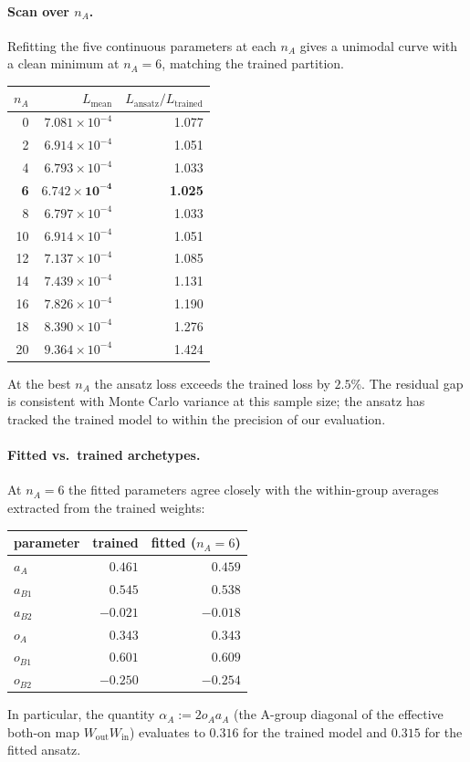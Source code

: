 \documentclass[11pt]{article}
\begin{document}
\paragraph{Scan over $n_A$.}
Refitting the five continuous parameters at each $n_A$ gives a unimodal curve with a clean minimum at $n_A = 6$, matching the trained partition.
\begin{center}
\begin{tabular}{rrr}
\toprule
$n_A$ & $L_{\mathrm{mean}}$ & $L_{\mathrm{ansatz}} / L_{\mathrm{trained}}$ \\
\midrule
0  & $7.081 \times 10^{-4}$ & 1.077 \\
2  & $6.914 \times 10^{-4}$ & 1.051 \\
4  & $6.793 \times 10^{-4}$ & 1.033 \\
\textbf{6}  & $\mathbf{6.742 \times 10^{-4}}$ & \textbf{1.025} \\
8  & $6.797 \times 10^{-4}$ & 1.033 \\
10 & $6.914 \times 10^{-4}$ & 1.051 \\
12 & $7.137 \times 10^{-4}$ & 1.085 \\
14 & $7.439 \times 10^{-4}$ & 1.131 \\
16 & $7.826 \times 10^{-4}$ & 1.190 \\
18 & $8.390 \times 10^{-4}$ & 1.276 \\
20 & $9.364 \times 10^{-4}$ & 1.424 \\
\bottomrule
\end{tabular}
\end{center}
At the best $n_A$ the ansatz loss exceeds the trained loss by $2.5\%$.
The residual gap is consistent with Monte Carlo variance at this sample size; the ansatz has tracked the trained model to within the precision of our evaluation.

\paragraph{Fitted vs.\ trained archetypes.}
At $n_A = 6$ the fitted parameters agree closely with the within-group averages extracted from the trained weights:
\begin{center}
\begin{tabular}{lrr}
\toprule
parameter & trained & fitted ($n_A = 6$) \\
\midrule
$a_A$   &  $0.461$ & $0.459$ \\
$a_{B1}$ & $0.545$ & $0.538$ \\
$a_{B2}$ & $-0.021$ & $-0.018$ \\
$o_A$   &  $0.343$ & $0.343$ \\
$o_{B1}$ & $0.601$ & $0.609$ \\
$o_{B2}$ & $-0.250$ & $-0.254$ \\
\bottomrule
\end{tabular}
\end{center}
In particular, the quantity $\alpha_A := 2 o_A a_A$ (the A-group diagonal of the effective both-on map $W_{\mathrm{out}} W_{\mathrm{in}}$) evaluates to $0.316$ for the trained model and $0.315$ for the fitted ansatz.
\end{document}
